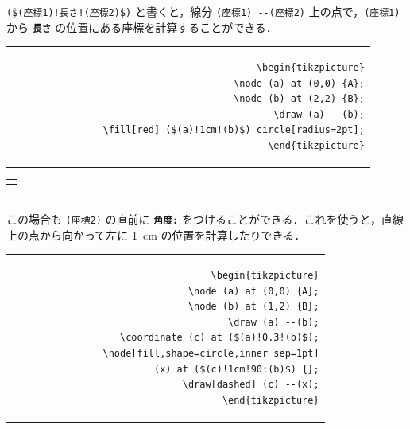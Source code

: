 \documentclass[lualatex]{jlreq}
\begin{document}
\verb|($(座標1)!長さ!(座標2)$)| と書くと，線分 \verb|(座標1) --(座標2)| 上の点で，\verb|(座標1)| から \textbf{\texttt{長さ}} の位置にある座標を計算することができる．
\\[0.5em]
\begin{minipage}{0.58 \textwidth}
    \begin{flushright}
        \begin{tabular}{r}
            \begin{lstlisting}[language={[LaTeX] TeX},
            numbers=none,breaklines=true,gobble=12,frame=none]
            \begin{tikzpicture}
                \node (a) at (0,0) {A};
                \node (b) at (2,2) {B};
                \draw (a) --(b);
                \fill[red] ($(a)!1cm!(b)$) circle[radius=2pt];
            \end{tikzpicture}
            \end{lstlisting}
        \end{tabular}
    \end{flushright}
\end{minipage}
\hfill
\begin{minipage}{0.34 \textwidth}
    \begin{flushleft}
        \begin{tabular}{l}
            \begin{tikzpicture}
                \node (a) at (0,0) {A};
                \node (b) at (2,2) {B};
                \draw (a) --(b);
                \fill[red] ($(a)!1cm!(b)$) circle[radius=2pt];
            \end{tikzpicture}
        \end{tabular}
    \end{flushleft}
\end{minipage}
\\[1em]
この場合も \verb|(座標2)| の直前に \textbf{\texttt{角度:}} をつけることができる．これを使うと，直線上の点から向かって左に \qty{1}{cm} の位置を計算したりできる．
\\[0.5em]
\begin{minipage}{0.58 \textwidth}
    \begin{flushright}
        \begin{tabular}{r}
            \begin{lstlisting}[language={[LaTeX] TeX},
            numbers=none,breaklines=true,gobble=12,frame=none]
            \begin{tikzpicture}
                \node (a) at (0,0) {A};
                \node (b) at (1,2) {B};
                \draw (a) --(b);
                \coordinate (c) at ($(a)!0.3!(b)$);
                \node[fill,shape=circle,inner sep=1pt]
                    (x) at ($(c)!1cm!90:(b)$) {};
                \draw[dashed] (c) --(x);
            \end{tikzpicture}
            \end{lstlisting}
        \end{tabular}
    \end{flushright}
\end{minipage}
\end{document}
